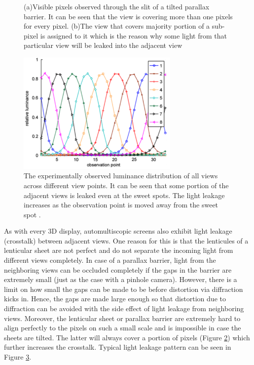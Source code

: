 \begin{figure}[htbp]
\begin{subfigure}[b]{0.4\textwidth}
        \caption{ }\label{fig:tilted_sheet_views}
    \end{subfigure}

    \caption{(a)Visible pixels observed through the slit of a tilted parallax barrier. It can be seen that the view is covering more than one pixels for every pixel. (b)The view that covers majority portion of a sub-pixel is assigned to it which is the reason why some light from that particular view will be leaked into the adjacent view \cite{wang2014improved}\label{fig:automultiscopic_sheet}}
\end{figure}
\begin{figure}
\centering
    \includegraphics[width=0.7\textwidth]{./Template_Figures/Gaussians}
    \caption{ The experimentally observed luminance distribution of all views across different view points. It can be seen that some portion of the adjacent views is leaked even at the sweet spots. The light leakage increases as the observation point is moved away from the sweet spot \cite{woods2012crosstalk}.\label{fig:gaussians}}
\end{figure}

As with every 3D display, automultiscopic screens also exhibit light leakage (crosstalk) between adjacent views. One reason for this is that the lenticules of a lenticular sheet are not perfect and do not separate the incoming light from different views completely. In case of a parallax barrier, light from the neighboring views can be occluded completely if the gaps in the barrier are extremely small (just as the case with a pinhole camera). However, there is a limit on how small the gaps can be made to be before distortion via diffraction kicks in. Hence, the gaps are made large enough so that distortion due to diffraction can be avoided with the side effect of light leakage from neighboring views. Moreover, the lenticular sheet or parallax barrier are extremely hard to align perfectly to the pixels on such a small scale and is impossible in case the sheets are tilted. The latter will always cover a portion of pixels (Figure \ref{fig:automultiscopic_sheet}) which further increases the crosstalk. Typical light leakage pattern can be seen in Figure \ref{fig:gaussians}.


